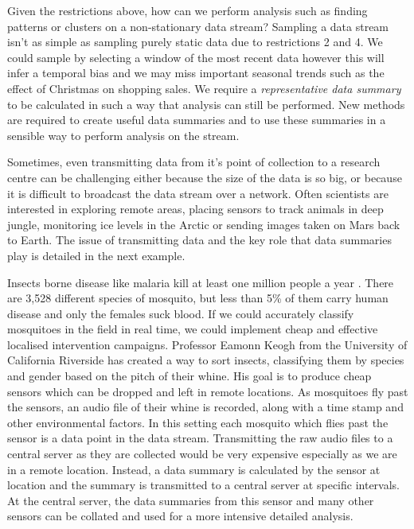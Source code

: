 Given the restrictions above, how can we perform analysis such as finding patterns or clusters on a non-stationary data stream? Sampling a data stream isn't as simple as sampling purely static data due to restrictions 2 and 4. We could sample by selecting a window of the most recent data however this will infer a temporal bias and we may miss important seasonal trends such as the effect of Christmas on shopping sales. We require a \textit{representative data summary} to be calculated in such a way that analysis can still be performed.  New methods are required to create useful data summaries and to use these summaries in a sensible way to perform analysis on the stream. 

Sometimes, even transmitting data from it's point of collection to a research centre can be challenging either because the size of the data is so big, or because it is difficult to broadcast the data stream over a network. Often scientists are interested in exploring remote areas, placing sensors to track animals in deep jungle, monitoring ice levels in the Arctic or sending images taken on Mars back to Earth. The issue of transmitting data and the key role that data summaries play is detailed in the next example.

Insects borne disease like malaria kill at least one million people a year \citep{Murray2012}. There are 3,528 different species of mosquito, but less than 5\% of them carry human disease and only the females suck blood. If we could accurately classify mosquitoes in the field in real time, we could implement cheap and effective localised intervention campaigns. Professor Eamonn Keogh from the University of California Riverside \citep{Chen2014, Harkness2016} has created a way to sort insects, classifying them by species and gender based on the pitch of their whine. His goal is to produce cheap sensors which can be dropped and left in remote locations. As mosquitoes fly past the sensors, an audio file of their whine is recorded, along with a time stamp and other environmental factors. In this setting each  mosquito which flies past the sensor is a data point in the data stream. Transmitting the raw audio files to a central server as they are collected would be very expensive especially as we are in a remote location. Instead, a data summary is calculated by the sensor at location and the summary is transmitted to a central server at specific intervals. At the central server, the data summaries from this sensor and many other sensors can be collated and used for a more intensive detailed analysis.

